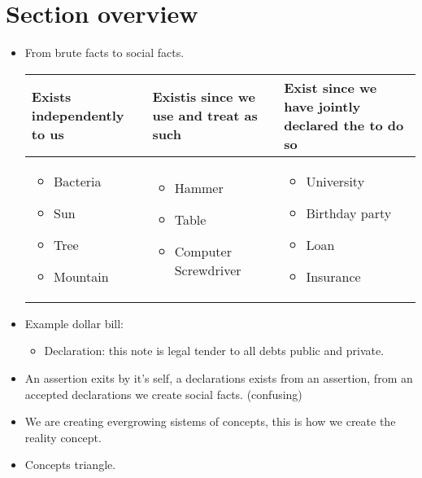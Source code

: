 \section{Section overview}
\begin{itemize}
    \item From brute facts to social facts.
        \begin{center}
        \begin{tabular}{ | p{5cm} | p{5cm} | p{5cm} | }
            \hline
                Exists independently to us & Existis since we use and treat as such & Exist since we have jointly declared the to do so     \\
            \hline
                \begin{itemize}
                    \item Bacteria 
                    \item Sun 
                    \item Tree 
                    \item Mountain 
                \end{itemize}
                & 
                \begin{itemize}
                    \item Hammer 
                    \item Table 
                    \item Computer Screwdriver
                \end{itemize}
                & \begin{itemize}
                    \item University
                    \item Birthday party 
                    \item Loan 
                    \item Insurance
                \end{itemize}
                \\ 
                \hline
        \end{tabular}
        \end{center}
    
    \item Example dollar bill:
        \begin{itemize}
            \item Declaration: this note is legal tender to all debts public and private.
        \end{itemize}
    
    \item An assertion exits by it's self, a declarations exists from an assertion, from an accepted declarations we create social facts. (confusing)
    
    \item We are creating evergrowing sistems of concepts, this is how we create the reality concept.    

    \item Concepts triangle.
\end{itemize}



